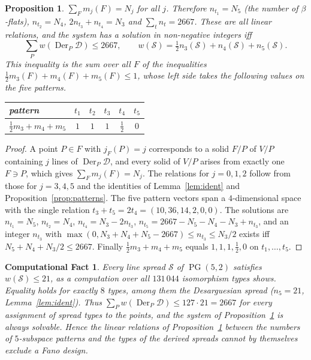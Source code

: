 \documentclass[11pt]{amsart}
\newtheorem{proposition}[theorem]{Proposition}
\newtheorem{fact}[theorem]{Computational Fact}
\theoremstyle{definition}
\newcommand{\D}{\mathcal{D}}
\newcommand{\PG}{\operatorname{PG}}
\newcommand{\Der}{\operatorname{Der}}
\begin{document}
\begin{proposition}\label{prop:glob}
$\sum_Fm_j(F)=N_j$ for all $j$. Therefore $n_{t_1}=N_5$ \textup{(}the number of $\beta$-flats\textup{)}, $n_{t_2}=N_4$, $2n_{t_3}+n_{t_4}=N_3$ and $\sum_tn_t=2667$. These are all linear relations, and the system has a solution in non-negative integers iff
\[
\textstyle\sum_Pw(\Der_P\D)\le2667,\qquad w(\mathcal S)=\tfrac12n_3(\mathcal S)+n_4(\mathcal S)+n_5(\mathcal S).
\]
This inequality is the sum over all $F$ of the inequalities $\tfrac12m_3(F)+m_4(F)+m_5(F)\le1$, whose left side takes the following values on the five patterns.
\begin{center}\small
\begin{tabular}{@{}l|ccccc@{}}
pattern & $t_1$ & $t_2$ & $t_3$ & $t_4$ & $t_5$\\\hline
$\tfrac12m_3+m_4+m_5$ & $1$ & $1$ & $1$ & $\tfrac12$ & $0$
\end{tabular}
\end{center}
\end{proposition}
\begin{proof}
A point $P\in F$ with $j_F(P)=j$ corresponds to a solid $F/P$ of $V/P$ containing $j$ lines of $\Der_P\D$, and every solid of $V/P$ arises from exactly one $F\ni P$, which gives $\sum_Fm_j(F)=N_j$. The relations for $j=0,1,2$ follow from those for $j=3,4,5$ and the identities of Lemma~\ref{lem:ident} and Proposition~\ref{prop:patterns}. The five pattern vectors span a $4$-dimensional space with the single relation $t_3+t_5=2t_4=(10,36,14,2,0,0)$. The solutions are $n_{t_1}=N_5$, $n_{t_2}=N_4$, $n_{t_4}=N_3-2n_{t_3}$, $n_{t_5}=2667-N_5-N_4-N_3+n_{t_3}$, and an integer $n_{t_3}$ with $\max(0,N_3+N_4+N_5-2667)\le n_{t_3}\le N_3/2$ exists iff $N_5+N_4+N_3/2\le2667$. Finally $\tfrac12m_3+m_4+m_5$ equals $1,1,1,\tfrac12,0$ on $t_1,\dots,t_5$.
\end{proof}

\begin{fact}\label{fact:w}
Every line spread $\mathcal S$ of $\PG(5,2)$ satisfies $w(\mathcal S)\le21$, as a computation over all $131\,044$ isomorphism types \cite{MT09} shows. Equality holds for exactly $8$ types, among them the Desarguesian spread ($n_5=21$, Lemma~\ref{lem:ident}). Thus $\sum_Pw(\Der_P\D)\le127\cdot21=2667$ for every assignment of spread types to the points, and the system of Proposition~\ref{prop:glob} is always solvable. Hence the linear relations of Proposition~\ref{prop:glob} between the numbers of $5$-subspace patterns and the types of the derived spreads cannot by themselves exclude a Fano design.
\end{fact}
\end{document}
